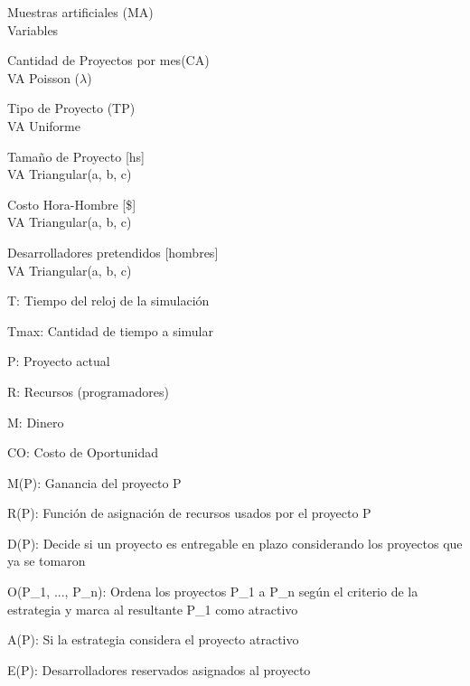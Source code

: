 \begin{multicols}{2}
Muestras artificiales (MA)\\
Variables

\begin{enumerate*}
    \item Cantidad de Proyectos por mes(CA)\\
            VA Poisson ($\lambda$)
    \item Tipo de Proyecto (TP)\\
            VA Uniforme
    \item Tamaño de Proyecto [hs]\\
            VA Triangular(a, b, c)
    \item Costo Hora-Hombre [\$]\\
            VA Triangular(a, b, c)
    \item Desarrolladores pretendidos [hombres]\\
            VA Triangular(a, b, c)
\end{enumerate*}
\vfill
\columnbreak
\begin{itemize*}
 \item T: Tiempo del reloj de la simulación
 \item Tmax: Cantidad de tiempo a simular
 \item P: Proyecto actual
 \item R: Recursos (programadores)
 \item M: Dinero
 \item CO: Costo de Oportunidad
 \item M(P): Ganancia del proyecto P
 \item R(P): Función de asignación de recursos usados por el proyecto P
 \item D(P): Decide si un proyecto es entregable en plazo considerando los proyectos que ya se tomaron
 \item O(P\_1, ..., P\_n): Ordena los proyectos P\_1 a P\_n según el criterio de la estrategia y marca al resultante P\_1 como atractivo
 \item A(P): Si la estrategia considera el proyecto atractivo
 \item E(P): Desarrolladores reservados asignados al proyecto

\end{itemize*}

\end{multicols}

